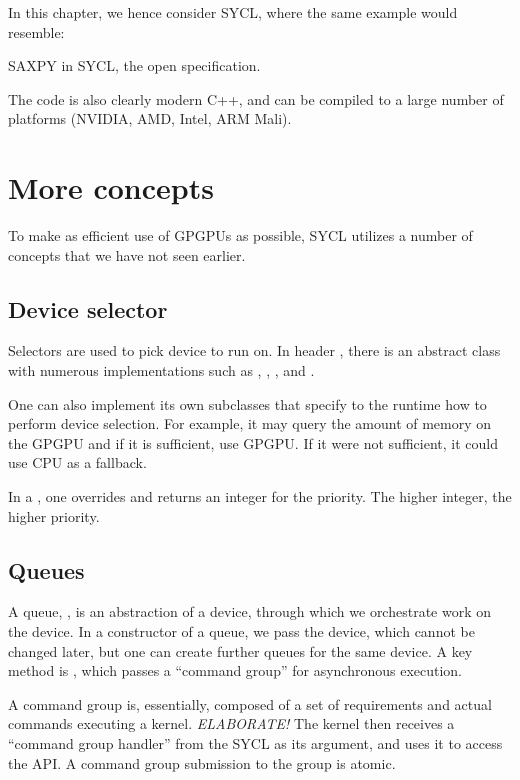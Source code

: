 In this chapter, we hence consider SYCL, where the same example would resemble:

\raggedbottom
\begin{codebox}[]{}
\footnotesize SAXPY in SYCL, the open specification.
\tcblower
{}
\end{codebox}

The code is also clearly modern C++, and can be compiled to a large number of platforms (NVIDIA, AMD, Intel, ARM Mali).

\section{More concepts}

To make as efficient use of GPGPUs as possible, SYCL utilizes a number of concepts that 
we have not seen earlier.

\subsection{Device selector}

Selectors are used to pick device to run on.
In header , there is an abstract class  with numerous implementations
such as , , , and .

One can also implement its own subclasses that specify to the runtime how to perform device selection.
For example, it may query the amount of memory on the GPGPU and if it is sufficient, 
use GPGPU. If it were not sufficient, it could use CPU as a fallback. 

In a , one overrides 
and returns an integer for the priority. The higher integer, the higher priority. 

\subsection{Queues}

A queue, , is an abstraction of a device,
through which we orchestrate work on the device.
In a constructor of a queue, we pass the device, which cannot be changed later,
but one can create further queues for the same device.
A key method is ,
which passes a ``command group'' for asynchronous execution. 

A command group is, essentially, composed of a set of requirements and actual commands executing a kernel. 
\emph{ELABORATE!}
The kernel then receives a ``command group handler'' from the SYCL as its argument,
and uses it to access the API. 
A command group submission to the group is atomic.  

